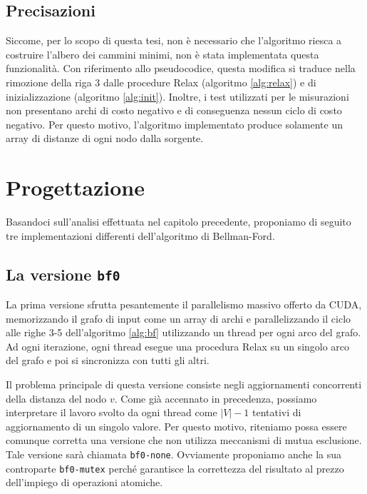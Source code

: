 \documentclass[12pt,a4paper,oneside]{book}
\begin{document}
	\section{Precisazioni}
	Siccome, per lo scopo di questa tesi, non è necessario che l'algoritmo riesca a costruire l'albero dei cammini minimi, non è stata implementata questa funzionalità. Con riferimento allo pseudocodice, questa modifica si traduce nella rimozione della riga 3 dalle procedure Relax (algoritmo \ref{alg:relax}) e di inizializzazione (algoritmo \ref{alg:init}). Inoltre, i test utilizzati per le misurazioni non presentano archi di costo negativo e di conseguenza nessun ciclo di costo negativo. Per questo motivo, l'algoritmo implementato produce solamente un array di distanze di ogni nodo dalla sorgente.
	
	\chapter{Progettazione}
	\label{chap:progettazione}
	Basandoci sull'analisi effettuata nel capitolo precedente, proponiamo di seguito tre implementazioni differenti dell'algoritmo di Bellman-Ford.
	
	\section{La versione \texttt{bf0}}
	La prima versione sfrutta pesantemente il parallelismo massivo offerto da CUDA, memorizzando il grafo di input come un array di archi e parallelizzando il ciclo alle righe 3-5 dell'algoritmo \ref{alg:bf} utilizzando un thread per ogni arco del grafo. Ad ogni iterazione, ogni thread esegue una procedura Relax su un singolo arco del grafo e poi si sincronizza con tutti gli altri.
	
	Il problema principale di questa versione consiste negli aggiornamenti concorrenti della distanza del nodo $v$. Come già accennato in precedenza, possiamo interpretare il lavoro svolto da ogni thread come $|V|-1$ tentativi di aggiornamento di un singolo valore. Per questo motivo, riteniamo possa essere comunque corretta una versione che non utilizza meccanismi di mutua esclusione. Tale versione sarà chiamata \texttt{bf0-none}. Ovviamente proponiamo anche la sua controparte \texttt{bf0-mutex} perché garantisce la correttezza del risultato al prezzo dell'impiego di operazioni atomiche.
	
\end{document}
